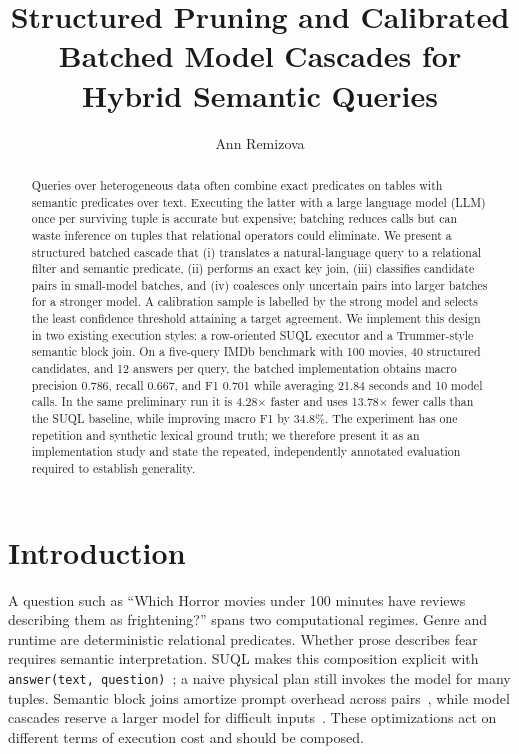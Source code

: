 \documentclass[sigconf,review]{acmart}
\begin{document}
\title{Structured Pruning and Calibrated Batched Model Cascades for Hybrid Semantic Queries}
\author{Ann Remizova}
\renewcommand{\shortauthors}{Remizova}

\begin{abstract}
Queries over heterogeneous data often combine exact predicates on tables with
semantic predicates over text. Executing the latter with a large language model
(LLM) once per surviving tuple is accurate but expensive; batching reduces calls
but can waste inference on tuples that relational operators could eliminate. We
present a structured batched cascade that (i) translates a natural-language query
to a relational filter and semantic predicate, (ii) performs an exact key join,
(iii) classifies candidate pairs in small-model batches, and (iv) coalesces only
uncertain pairs into larger batches for a stronger model. A calibration sample is
labelled by the strong model and selects the least confidence threshold attaining
a target agreement. We implement this design in two existing execution styles:
a row-oriented SUQL executor and a Trummer-style semantic block join. On a
five-query IMDb benchmark with 100 movies, 40 structured candidates, and 12
answers per query, the batched implementation obtains macro precision 0.786,
recall 0.667, and F1 0.701 while averaging 21.84 seconds and 10 model calls. In
the same preliminary run it is 4.28$\times$ faster and uses 13.78$\times$ fewer
calls than the SUQL baseline, while improving macro F1 by 34.8\%. The experiment
has one repetition and synthetic lexical ground truth; we therefore present it
as an implementation study and state the repeated, independently annotated
evaluation required to establish generality.
\end{abstract}
\maketitle

\section{Introduction}
A question such as ``Which Horror movies under 100 minutes have reviews
describing them as frightening?'' spans two computational regimes. Genre and
runtime are deterministic relational predicates. Whether prose describes fear
requires semantic interpretation. SUQL makes this composition explicit with
\texttt{answer(text, question)}~\cite{liu2024suql}; a naive physical plan still
invokes the model for many tuples. Semantic block joins amortize prompt overhead
across pairs~\cite{trummer2025semanticjoins}, while model cascades reserve a
larger model for difficult inputs~\cite{chen2023frugalgpt}. These optimizations
act on different terms of execution cost and should be composed.
\end{document}
